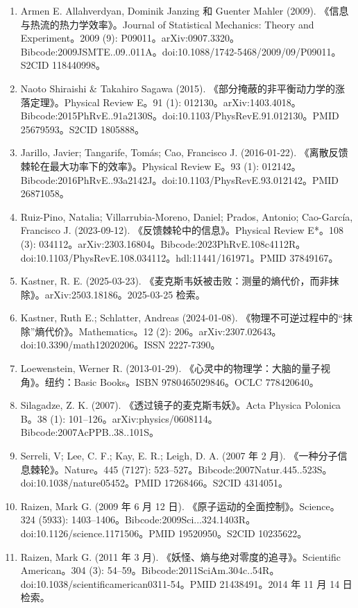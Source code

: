 \begin{enumerate}
\item Armen E. Allahverdyan, Dominik Janzing 和 Guenter Mahler (2009). 《信息与热流的热力学效率》。Journal of Statistical Mechanics: Theory and Experiment。2009 (9): P09011。arXiv:0907.3320。Bibcode:2009JSMTE..09..011A。doi:10.1088/1742-5468/2009/09/P09011。S2CID 118440998。
\item Naoto Shiraishi & Takahiro Sagawa (2015). 《部分掩蔽的非平衡动力学的涨落定理》。Physical Review E。91 (1): 012130。arXiv:1403.4018。Bibcode:2015PhRvE..91a2130S。doi:10.1103/PhysRevE.91.012130。PMID 25679593。S2CID 1805888。
\item Jarillo, Javier; Tangarife, Tomás; Cao, Francisco J. (2016-01-22). 《离散反馈棘轮在最大功率下的效率》。Physical Review E。93 (1): 012142。Bibcode:2016PhRvE..93a2142J。doi:10.1103/PhysRevE.93.012142。PMID 26871058。
\item Ruiz-Pino, Natalia; Villarrubia-Moreno, Daniel; Prados, Antonio; Cao-García, Francisco J. (2023-09-12). 《反馈棘轮中的信息》。Physical Review E*。108 (3): 034112。arXiv:2303.16804。Bibcode:2023PhRvE.108c4112R。doi:10.1103/PhysRevE.108.034112。hdl:11441/161971。PMID 37849167。
\item Kastner, R. E. (2025-03-23). 《麦克斯韦妖被击败：测量的熵代价，而非抹除》。arXiv:2503.18186。2025-03-25 检索。
\item Kastner, Ruth E.; Schlatter, Andreas (2024-01-08). 《物理不可逆过程中的“抹除”熵代价》。Mathematics。12 (2): 206。arXiv:2307.02643。doi:10.3390/math12020206。ISSN 2227-7390。
\item Loewenstein, Werner R. (2013-01-29). 《心灵中的物理学：大脑的量子视角》。纽约：Basic Books。ISBN 9780465029846。OCLC 778420640。
\item Silagadze, Z. K. (2007). 《透过镜子的麦克斯韦妖》。Acta Physica Polonica B。38 (1): 101–126。arXiv:physics/0608114。Bibcode:2007AcPPB..38..101S。
\item Serreli, V; Lee, C. F.; Kay, E. R.; Leigh, D. A. (2007 年 2 月). 《一种分子信息棘轮》。Nature。445 (7127): 523–527。Bibcode:2007Natur.445..523S。doi:10.1038/nature05452。PMID 17268466。S2CID 4314051。
\item Raizen, Mark G. (2009 年 6 月 12 日). 《原子运动的全面控制》。Science。324 (5933): 1403–1406。Bibcode:2009Sci...324.1403R。doi:10.1126/science.1171506。PMID 19520950。S2CID 10235622。
\item Raizen, Mark G. (2011 年 3 月). 《妖怪、熵与绝对零度的追寻》。Scientific American。304 (3): 54–59。Bibcode:2011SciAm.304c..54R。doi:10.1038/scientificamerican0311-54。PMID 21438491。2014 年 11 月 14 日检索。

\end{enumerate}
